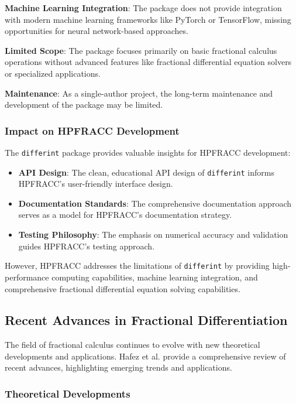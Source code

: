 \textbf{Machine Learning Integration}: The package does not provide integration with modern machine learning frameworks like PyTorch or TensorFlow, missing opportunities for neural network-based approaches.

\textbf{Limited Scope}: The package focuses primarily on basic fractional calculus operations without advanced features like fractional differential equation solvers or specialized applications.

\textbf{Maintenance}: As a single-author project, the long-term maintenance and development of the package may be limited.

\subsubsection{Impact on HPFRACC Development}

The \texttt{differint} package provides valuable insights for HPFRACC development:

\begin{itemize}
    \item \textbf{API Design}: The clean, educational API design of \texttt{differint} informs HPFRACC's user-friendly interface design.
    \item \textbf{Documentation Standards}: The comprehensive documentation approach serves as a model for HPFRACC's documentation strategy.
    \item \textbf{Testing Philosophy}: The emphasis on numerical accuracy and validation guides HPFRACC's testing approach.
\end{itemize}

However, HPFRACC addresses the limitations of \texttt{differint} by providing high-performance computing capabilities, machine learning integration, and comprehensive fractional differential equation solving capabilities.

\subsection{Recent Advances in Fractional Differentiation}

The field of fractional calculus continues to evolve with new theoretical developments and applications. Hafez et al. \cite{Hafez2025ReviewFractionalDifferentiation} provide a comprehensive review of recent advances, highlighting emerging trends and applications.

\subsubsection{Theoretical Developments}

